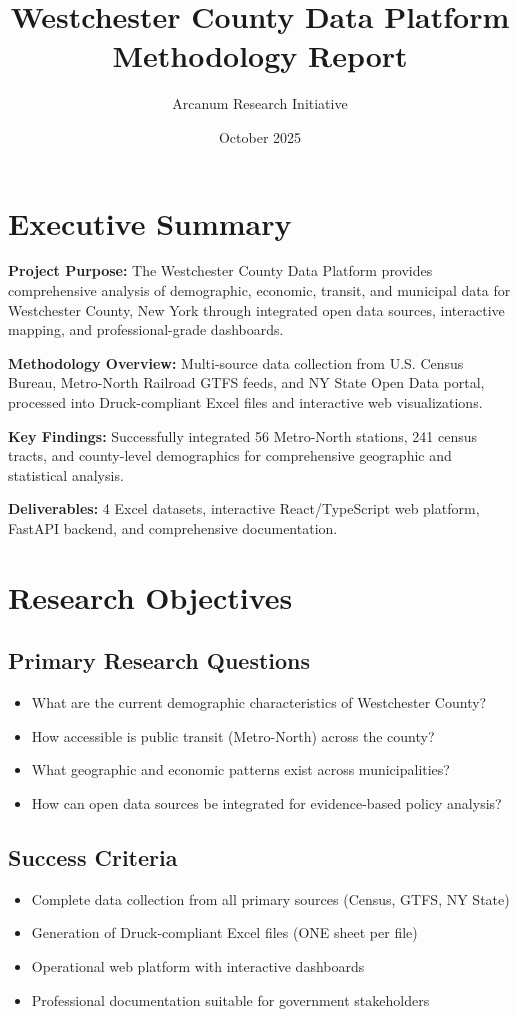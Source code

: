 \documentclass[11pt,letterpaper]{article}
\title{\textbf{Westchester County Data Platform}\\Methodology Report}
\author{Arcanum Research Initiative}
\date{October 2025}
\begin{document}
\maketitle

\tableofcontents
\newpage

\section{Executive Summary}

\textbf{Project Purpose:} The Westchester County Data Platform provides comprehensive analysis of demographic, economic, transit, and municipal data for Westchester County, New York through integrated open data sources, interactive mapping, and professional-grade dashboards.

\textbf{Methodology Overview:} Multi-source data collection from U.S. Census Bureau, Metro-North Railroad GTFS feeds, and NY State Open Data portal, processed into Druck-compliant Excel files and interactive web visualizations.

\textbf{Key Findings:} Successfully integrated 56 Metro-North stations, 241 census tracts, and county-level demographics for comprehensive geographic and statistical analysis.

\textbf{Deliverables:} 4 Excel datasets, interactive React/TypeScript web platform, FastAPI backend, and comprehensive documentation.

\section{Research Objectives}

\subsection{Primary Research Questions}
\begin{itemize}
    \item What are the current demographic characteristics of Westchester County?
    \item How accessible is public transit (Metro-North) across the county?
    \item What geographic and economic patterns exist across municipalities?
    \item How can open data sources be integrated for evidence-based policy analysis?
\end{itemize}

\subsection{Success Criteria}
\begin{itemize}
    \item Complete data collection from all primary sources (Census, GTFS, NY State)
    \item Generation of Druck-compliant Excel files (ONE sheet per file)
    \item Operational web platform with interactive dashboards
    \item Professional documentation suitable for government stakeholders
\end{itemize}
\end{document}
